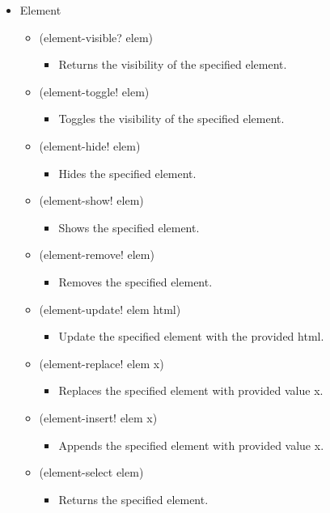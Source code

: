 \begin{itemize}
	\begin{itemize}
		\item {Element}
		\begin{itemize}
			\item {(element-visible? elem)}
				\begin{itemize}[label={}]
					\item  Returns the visibility of the specified element.
				\end{itemize}
			\item {(element-toggle! elem)}
			    \begin{itemize}[label={}]
			    	\item  Toggles the visibility of the specified element.
			    \end{itemize}
			\item {(element-hide! elem)}
			    \begin{itemize}[label={}]
			    	\item  Hides the specified element.
			    \end{itemize}
			\item {(element-show! elem)}
			    \begin{itemize}[label={}]
			    	\item  Shows the specified element.
			    \end{itemize}
			\item {(element-remove! elem)}
			    \begin{itemize}[label={}]
			    	\item  Removes the specified element.
			    \end{itemize}
			\item {(element-update! elem html)}
			    \begin{itemize}[label={}]
			    	\item  Update the specified element with the provided html.
			    \end{itemize}
			\item {(element-replace! elem x)}
			    \begin{itemize}[label={}]
			    	\item  Replaces the specified element with provided value x.
			    \end{itemize}
			\item {(element-insert! elem x)}
			    \begin{itemize}[label={}]
			    	\item  Appends the specified element with provided value x.
			    \end{itemize}
			\item {(element-select elem)}
			    \begin{itemize}[label={}]
			    	\item  Returns the specified element.
			    \end{itemize}
		\end{itemize}
	\end{itemize}
\end{itemize}

